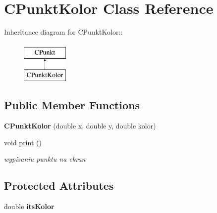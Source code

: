 \hypertarget{classCPunktKolor}{
\section{CPunktKolor Class Reference}
\label{classCPunktKolor}
}
Inheritance diagram for CPunktKolor::\begin{figure}[H]
\begin{center}
\leavevmode
\includegraphics[height=2cm]{classCPunktKolor}
\end{center}
\end{figure}
\subsection*{Public Member Functions}
\begin{CompactItemize}
\item 
\hypertarget{classCPunktKolor_429f7b2a2fd812e024dc84dc81ecc8b9}{
\textbf{CPunktKolor} (double x, double y, double kolor)}
\label{classCPunktKolor_429f7b2a2fd812e024dc84dc81ecc8b9}

\item 
\hypertarget{classCPunktKolor_b677ed8de3e1b051825f72dc881d39a6}{
void \hyperlink{classCPunktKolor_b677ed8de3e1b051825f72dc881d39a6}{print} ()}
\label{classCPunktKolor_b677ed8de3e1b051825f72dc881d39a6}

\begin{CompactList}\small\item\em wypisaniu punktu na ekran \item\end{CompactList}\end{CompactItemize}
\subsection*{Protected Attributes}
\begin{CompactItemize}
\item 
\hypertarget{classCPunktKolor_c896dbca9ab9e63f20ed97b2341fc72e}{
double \textbf{itsKolor}}
\label{classCPunktKolor_c896dbca9ab9e63f20ed97b2341fc72e}

\end{CompactItemize}
